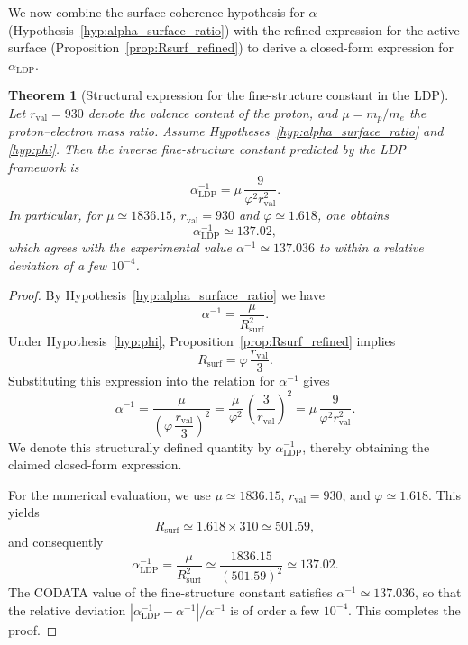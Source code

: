 \documentclass[11pt,a4paper]{article}
\theoremstyle{plain}
\newtheorem{theorem}{Theorem}
\theoremstyle{definition}
\theoremstyle{remark}
\begin{document}
We now combine the surface-coherence hypothesis for \(\alpha\) (Hypothesis~\ref{hyp:alpha_surface_ratio}) with the refined expression for the active surface (Proposition~\ref{prop:Rsurf_refined}) to derive a closed-form expression for \(\alpha_{\mathrm{LDP}}\).

\begin{theorem}[Structural expression for the fine-structure constant in the LDP]
  \label{thm:alpha_LDP}
  Let \(r_{\mathrm{val}} = 930\) denote the valence content of the proton, and \(\mu = m_p/m_e\) the proton--electron mass ratio.
  Assume Hypotheses~\ref{hyp:alpha_surface_ratio} and \ref{hyp:phi}. Then the inverse fine-structure constant predicted by the LDP framework is
  \[
    \alpha_{\mathrm{LDP}}^{-1}
    = \mu\, \frac{9}{\varphi^2 r_{\mathrm{val}}^2}.
  \]
  In particular, for \(\mu \simeq 1836.15\), \(r_{\mathrm{val}} = 930\) and
  \(\varphi \simeq 1.618\), one obtains
  \[
    \alpha_{\mathrm{LDP}}^{-1} \simeq 137.02,
  \]
  which agrees with the experimental value \(\alpha^{-1} \simeq 137.036\) to within a relative deviation of a few \(10^{-4}\).
\end{theorem}

\begin{proof}
  By Hypothesis~\ref{hyp:alpha_surface_ratio} we have
  \[
    \alpha^{-1} = \frac{\mu}{R_{\mathrm{surf}}^2}.
  \]
  Under Hypothesis~\ref{hyp:phi}, Proposition~\ref{prop:Rsurf_refined} implies
  \[
    R_{\mathrm{surf}} = \varphi\, \frac{r_{\mathrm{val}}}{3}.
  \]
  Substituting this expression into the relation for \(\alpha^{-1}\) gives
  \[
    \alpha^{-1}
    = \frac{\mu}{\left(\varphi\, \dfrac{r_{\mathrm{val}}}{3}\right)^2}
    = \frac{\mu}{\varphi^2}\, \left(\frac{3}{r_{\mathrm{val}}}\right)^2
    = \mu\, \frac{9}{\varphi^2 r_{\mathrm{val}}^2}.
  \]
  We denote this structurally defined quantity by \(\alpha_{\mathrm{LDP}}^{-1}\),
  thereby obtaining the claimed closed-form expression.

  For the numerical evaluation, we use
  \(\mu \simeq 1836.15\),
  \(r_{\mathrm{val}} = 930\),
  and \(\varphi \simeq 1.618\).
  This yields
  \[
    R_{\mathrm{surf}} \simeq 1.618 \times 310 \simeq 501.59,
  \]
  and consequently
  \[
    \alpha_{\mathrm{LDP}}^{-1}
    = \frac{\mu}{R_{\mathrm{surf}}^2}
    \simeq \frac{1836.15}{(501.59)^2}
    \simeq 137.02.
  \]
  The CODATA value of the fine-structure constant satisfies
  \(\alpha^{-1} \simeq 137.036\), so that the relative deviation
  \(|\alpha_{\mathrm{LDP}}^{-1} - \alpha^{-1}|/\alpha^{-1}\) is of order a few
  \(10^{-4}\). This completes the proof.
\end{proof}
\end{document}
